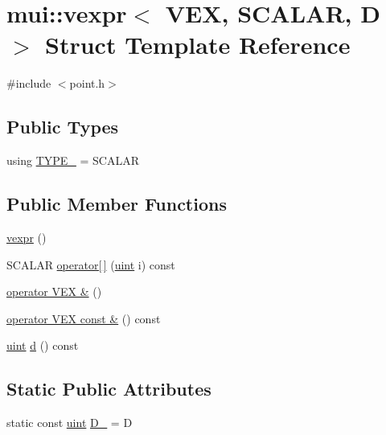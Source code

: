 \hypertarget{structmui_1_1vexpr}{}\section{mui\+:\+:vexpr$<$ V\+EX, S\+C\+A\+L\+AR, D $>$ Struct Template Reference}
\label{structmui_1_1vexpr}


{\ttfamily \#include $<$point.\+h$>$}

\subsection*{Public Types}
\begin{DoxyCompactItemize}
\item 
using \hyperlink{structmui_1_1vexpr_a496707e81396551f39f8361b952c2e54}{T\+Y\+P\+E\+\_\+} = S\+C\+A\+L\+AR
\end{DoxyCompactItemize}
\subsection*{Public Member Functions}
\begin{DoxyCompactItemize}
\item 
\hyperlink{structmui_1_1vexpr_a947119cd55ee5d64647810ba1c9386fe}{vexpr} ()
\item 
S\+C\+A\+L\+AR \hyperlink{structmui_1_1vexpr_a4e1b8b2db02353296dd5d96dfa3e12e7}{operator\mbox{[}$\,$\mbox{]}} (\hyperlink{namespacemui_af15a3e7188a2117fb9965277bb0cacd2}{uint} i) const
\item 
\hyperlink{structmui_1_1vexpr_a75b45ea85a172243bea2f21e61318744}{operator V\+E\+X \&} ()
\item 
\hyperlink{structmui_1_1vexpr_abffa7c2afa1e707dba9565d8f6bf9fef}{operator V\+E\+X const \&} () const
\item 
\hyperlink{namespacemui_af15a3e7188a2117fb9965277bb0cacd2}{uint} \hyperlink{structmui_1_1vexpr_a9e9ab82899a0221b4018c1eaf750e84d}{d} () const
\end{DoxyCompactItemize}
\subsection*{Static Public Attributes}
\begin{DoxyCompactItemize}
\item 
static const \hyperlink{namespacemui_af15a3e7188a2117fb9965277bb0cacd2}{uint} \hyperlink{structmui_1_1vexpr_ad1071e69bd16f8c886f8b92473227215}{D\+\_\+} = D
\end{DoxyCompactItemize}


